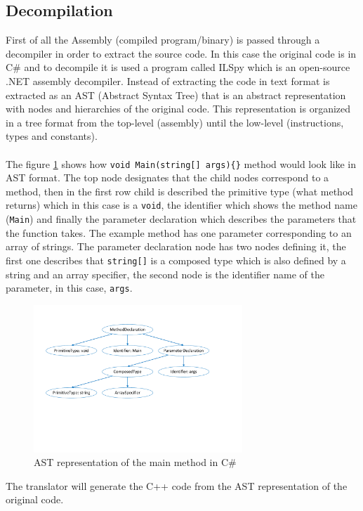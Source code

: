 \subsection{Decompilation}\label{SS:AN-Process-Decom}
First of all the Assembly (compiled program/binary) is passed through a decompiler in order to extract the source code. In this case the original code is in C\# and to decompile it is used a program called ILSpy which is an open-source .NET assembly decompiler. Instead of extracting the code in text format is extracted as an AST (Abstract Syntax Tree) that is an abstract representation with nodes and hierarchies of the original code. This representation is organized in a tree format from the top-level (assembly) until the low-level (instructions, types and constants).
\\
\\
The figure \ref{fig:AN-AST} shows how \verb!void Main(string[] args){}! method would look like in AST format. The top node designates that the child nodes correspond to a method, then in the first row child is described the primitive type (what method returns) which in this case is a \verb!void!, the identifier which shows the method name (\verb!Main!) and finally the parameter declaration which describes the parameters that the function takes. The example method has one parameter corresponding to an array of strings. The parameter declaration node has two nodes defining it, the first one describes that \verb!string[]! is a composed type which is also defined by a string and an array specifier, the second node is the identifier name of the parameter, in this case, \verb!args!.
\begin{figure}[H]\begin{center}
 \centering
  \captionsetup{justification=centering}
  \includegraphics[width=0.7\textwidth]{pictures/alternative/csharp_main_ast}
  \caption{AST representation of the main method in C\#\label{fig:AN-AST}}
\end{center}\end{figure}
The translator will generate the C++ code from the AST representation of the original code.
